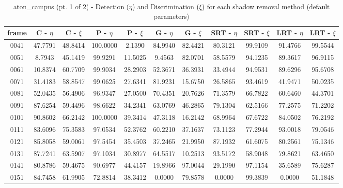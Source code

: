 \begin{appendices}
\begin{table}
\centering
\caption{aton\_campus (pt. 1 of 2) - Detection ($\eta$) and Discrimination ($\xi$) for each shadow removal method (default parameters)}
\begin{tabular}{ |c|c|c|c|c|c|c|c|c|c|c| }
	\hline
\textbf{frame} &  \textbf{C - $\eta$} &  \textbf{C - $\xi$} &  \textbf{P - $\eta$} &  \textbf{P - $\xi$} &  \textbf{G - $\eta$} &  \textbf{G - $\xi$} &  \textbf{SRT - $\eta$} &  \textbf{SRT - $\xi$} &  \textbf{LRT - $\eta$} &  \textbf{LRT - $\xi$} \\
\hline
\hline
0041 &  47.7791 &  48.8414 &   100.0000 &  2.1390 &   84.9940 &  82.4421 &   80.3121 &  99.9109 &   91.4766 &  99.5544    \\
\hline
0051 &  8.7943 &  45.1419 &   99.9291 &  11.5025 &   9.4563 &  82.0701 &   58.5579 &  94.1235 &   89.3617 &  96.9115    \\
\hline
0061 &  10.8374 &  60.7709 &   99.9034 &  28.2903 &   52.3671 &  36.3931 &   33.4944 &  94.9531 &   89.6296 &  95.6708    \\
\hline
0071 &  31.4183 &  58.8547 &   99.0625 &  27.6341 &   81.9231 &  15.6750 &   26.5865 &  93.4619 &   41.9471 &  50.0235    \\
\hline
0081 &  52.0435 &  56.4906 &   96.9347 &  27.0500 &   70.4351 &  20.7626 &   71.3579 &  66.7822 &   60.6460 &  44.3701    \\
\hline
0091 &  87.6254 &  59.4496 &   98.6622 &  34.2341 &   63.0769 &  46.2865 &   79.1304 &  62.5166 &   77.2575 &  71.2202    \\
\hline
0101 &  90.8602 &  66.2142 &   100.0000 &  39.3414 &   47.3118 &  16.2142 &   68.9964 &  67.6722 &   84.0502 &  76.2192    \\
\hline
0111 &  83.6096 &  75.3583 &   97.0534 &  52.3762 &   60.2210 &  37.1637 &   73.1123 &  77.2944 &   93.0018 &  79.0546    \\
\hline
0121 &  85.8058 &  59.0061 &   97.5454 &  35.4503 &   37.2465 &  21.9950 &   87.1932 &  61.6075 &   80.2561 &  75.1346    \\
\hline
0131 &  87.7241 &  63.5907 &   97.1034 &  30.8977 &   64.5517 &  10.2513 &   93.5172 &  58.9048 &   79.8621 &  63.4650    \\
\hline
0141 &  80.8786 &  59.4675 &   90.6977 &  44.4157 &   19.8966 &  97.0044 &   29.1990 &  97.1154 &   35.6589 &  75.6287   \\
\hline
0151 &  84.7458 &  61.9905 &   72.8814 &  38.3412 &   0.0000 &  79.8578 &   0.0000 &  99.3839 &   0.0000 &  51.1848   \\


\end{tabular}
\end{table}
\end{appendices}
